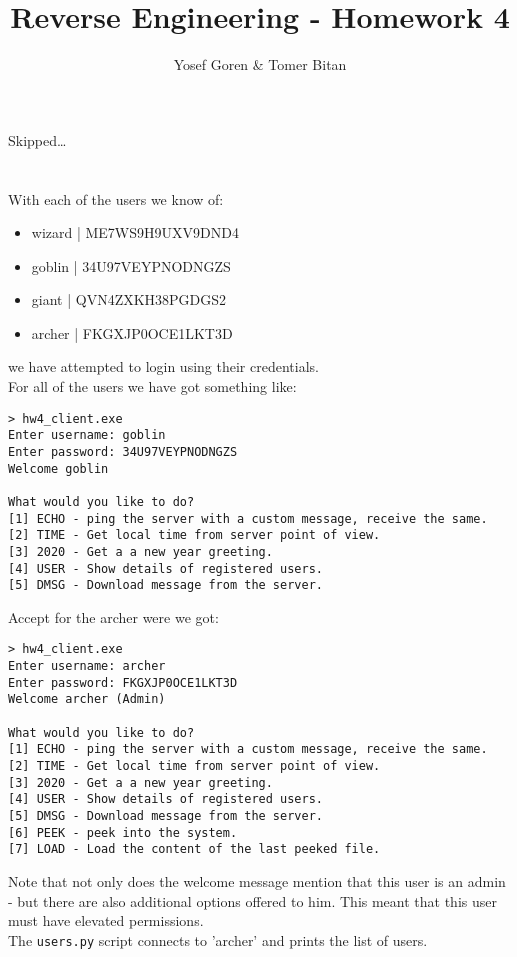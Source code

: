 \documentclass{article}
\begin{document}
\author{Yosef Goren \& Tomer Bitan}
\title{Reverse Engineering - Homework 4}
\section{}
Skipped\dots
\section{}
With each of the users we know of:
\begin{itemize}
    \item wizard | ME7WS9H9UXV9DND4
    \item goblin | 34U97VEYPNODNGZS
    \item giant | QVN4ZXKH38PGDGS2
    \item archer | FKGXJP0OCE1LKT3D
\end{itemize}
we have attempted to login using their credentials.\\
For all of the users we have got something like:
\begin{lstlisting}
> hw4_client.exe
Enter username: goblin
Enter password: 34U97VEYPNODNGZS
Welcome goblin

What would you like to do?
[1] ECHO - ping the server with a custom message, receive the same.
[2] TIME - Get local time from server point of view.
[3] 2020 - Get a a new year greeting.
[4] USER - Show details of registered users.
[5] DMSG - Download message from the server.
\end{lstlisting}
Accept for the archer were we got:
\begin{lstlisting}
> hw4_client.exe
Enter username: archer
Enter password: FKGXJP0OCE1LKT3D
Welcome archer (Admin)

What would you like to do?
[1] ECHO - ping the server with a custom message, receive the same.
[2] TIME - Get local time from server point of view.
[3] 2020 - Get a a new year greeting.
[4] USER - Show details of registered users.
[5] DMSG - Download message from the server.
[6] PEEK - peek into the system.
[7] LOAD - Load the content of the last peeked file.
\end{lstlisting}
Note that not only does the welcome message mention that this user is an admin
- but there are also additional options offered to him. This meant that this 
user must have elevated permissions.\\
The \texttt{users.py} script connects to 'archer' and prints the list of users.

\maketitle
\end{document}
